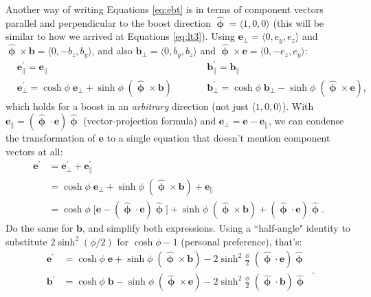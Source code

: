 \documentclass[12pt]{article}
\renewcommand{\vv}[1]{\mathbf{#1}}
\newcommand{\hatphi}{\bm{\hat{\upphi}}}
\begin{document}
Another way of writing Equations \ref{eq:ebt} is in terms of component vectors parallel and perpendicular to the boost direction $\hatphi = \langle 1, 0, 0 \rangle$ (this will be similar to how we arrived at Equations \ref{eq:lt3}). Using ${\vv e_\perp = \langle 0, e_y, e_z \rangle}$ and $\hatphi \times \vv b = \langle 0, -b_z, b_y \rangle$, and also $\vv b_\perp = \langle 0, b_y, b_z \rangle$ and $\hatphi \times \vv e = \langle 0, -e_z, e_y \rangle$:
\begin{equation*}
\begin{aligned}
& \vv e^\prime_\parallel = \vv e_\parallel  \qquad \qquad& & \vv b^\prime_\parallel = \vv b_\parallel  \\
& \vv e^\prime_\perp =  \cosh{\phi} \; \vv e_\perp  +  \sinh{\phi} \; ( \hatphi \times \vv b )   \qquad& & \vv b^\prime_\perp = \cosh{\phi} \; \vv b_\perp  - \sinh{\phi} \; ( \hatphi \times \vv e ) ,
\end{aligned}
\end{equation*}
which holds for a boost in an \emph{arbitrary} direction (not just $\langle 1, 0, 0 \rangle$). With $\vv e_\parallel = (\hatphi \cdot \vv e) \hatphi$ (vector-projection formula) and $\vv e_\perp = \vv e - \vv e_\parallel$, we can condense the transformation of $\vv e$ to a single equation that doesn't mention component vectors at all:
\begin{equation*}
\begin{split}
\vv e^\prime &= \vv e^\prime_\perp  + \vv e^\prime_\parallel \\
&= \cosh{\phi} \; \vv e_\perp  +  \sinh{\phi} \; ( \hatphi \times \vv b ) + \vv e_\parallel \\
&= \cosh{\phi} \; \big[ \vv e - (\hatphi \cdot \vv e) \hatphi \big] + \sinh{\phi} \; (\hatphi \times \vv b) + (\hatphi \cdot \vv e) \hatphi .
\end{split}
\end{equation*}
Do the same for $\vv b$, and simplify both expressions. Using a ``half-angle" identity to substitute $2 \sinh^2{(\phi/2)}$ for $\cosh{\phi} - 1$ (personal preference), that's:
\begin{equation}\label{eq:ebr}
\boxed{
\begin{aligned}
\vv e^\prime &= \cosh{\phi} \; \vv e + \sinh{\phi} \; (\hatphi \times \vv b) - 2 \sinh^2 \frac{\phi}{2} \; (\hatphi \cdot \vv e) \hatphi \\[4pt]
\vv b^\prime &= \cosh{\phi} \; \vv b - \sinh{\phi} \; (\hatphi \times \vv e) - 2 \sinh^2 \frac{\phi}{2} \; (\hatphi \cdot \vv b) \hatphi 
\end{aligned}
} \, .
\end{equation}
\end{document}
